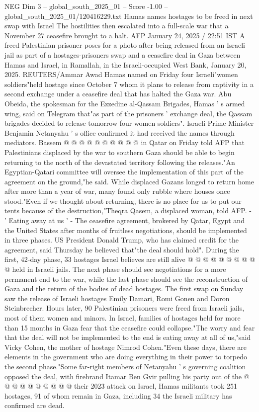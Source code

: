 \begin{textsample}{NEG Dim 3 – global\_south\_2025\_01 – Score -1.00 – global\_south\_2025\_01/120416229.txt}  \label{ex:f3_neg_071}
Hamas names hostages to be freed in next swap with Israel The hostilities then escalated into a full-scale war that a November 27 ceasefire brought to a halt.
AFP January 24, 2025 / 22:51 IST A freed Palestinian prisoner poses for a photo after being released from an Israeli jail as part of a hostages-prisoners swap and a ceasefire deal in Gaza between Hamas and Israel, in Ramallah, in the Israeli-occupied West Bank, January 20, 2025.
REUTERS/Ammar Awad Hamas named on Friday four Israeli"women soldiers"held hostage since October 7 whom it plans to release from captivity in a second exchange under a ceasefire deal that has halted the Gaza war.
Abu Obeida, the spokesman for the Ezzedine al-Qassam Brigades, Hamas ' s armed wing, said on Telegram that"as part of the prisoners ' exchange deal, the Qassam brigades decided to release tomorrow four women soldiers".
Israeli Prime Minister Benjamin Netanyahu ' s office confirmed it had received the names through mediators.
Bassem @ @ @ @ @ @ @ @ @ @ in Qatar on Friday told AFP that Palestinians displaced by the war to southern Gaza should be able to begin returning to the north of the devastated territory following the releases."An Egyptian-Qatari committee will oversee the implementation of this part of the agreement on the ground,"he said.
While displaced Gazans longed to return home after more than a year of war, many found only rubble where houses once stood."Even if we thought about returning, there is no place for us to put our tents because of the destruction,"Theqra Qasem, a displaced woman, told AFP. - ' Eating away at us ' - The ceasefire agreement, brokered by Qatar, Egypt and the United States after months of fruitless negotiations, should be implemented in three phases.
US President Donald Trump, who has claimed credit for the agreement, said Thursday he believed that"the deal should hold".
During the first, 42-day phase, 33 hostages Israel believes are still alive @ @ @ @ @ @ @ @ @ @ held in Israeli jails.
The next phase should see negotiations for a more permanent end to the war, while the last phase should see the reconstruction of Gaza and the return of the bodies of dead hostages.
The first swap on Sunday saw the release of Israeli hostages Emily Damari, Romi Gonen and Doron Steinbrecher.
Hours later, 90 Palestinian prisoners were freed from Israeli jails, most of them women and minors.
In Israel, families of hostages held for more than 15 months in Gaza fear that the ceasefire could collapse."The worry and fear that the deal will not be implemented to the end is eating away at all of us,"said Vicky Cohen, the mother of hostage Nimrod Cohen."Even these days, there are elements in the government who are doing everything in their power to torpedo the second phase."Some far-right members of Netanyahu ' s governing coalition opposed the deal, with firebrand Itamar Ben Gvir pulling his party out of the @ @ @ @ @ @ @ @ @ @ their 2023 attack on Israel, Hamas militants took 251 hostages, 91 of whom remain in Gaza, including 34 the Israeli military has confirmed are dead.

\end{textsample}
